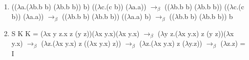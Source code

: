 \documentclass[14pt, a4paper]{article}
\def\next{$\rightarrow_\beta$\newline}
\def\lb{$\lambda$}
\begin{document}
\begin{enumerate}
\centering
    \item ((\lb a.(\lb b.b b) (\lb b.b b)) b) ((\lb c.(c b)) (\lb a.a)) \next
    ((\lb b.b b) (\lb b.b b)) ((\lb c.(c b)) (\lb a.a)) \next
    ((\lb b.b b) (\lb b.b b)) ((\lb a.a) b) \next
    ((\lb b.b b) (\lb b.b b)) b

    \item S K K = (\lb x y z.x z (y z))(\lb x y.x)(\lb x y.x) \next
    (\lb y z.(\lb x y.x) z (y z))(\lb x y.x) \next
    (\lb z.(\lb x y.x) z ((\lb x y.x) z)) \next
    (\lb z.(\lb x y.x) z (\lb y.z)) \next
    (\lb z.z) = I

\end{enumerate}
\end{document}
